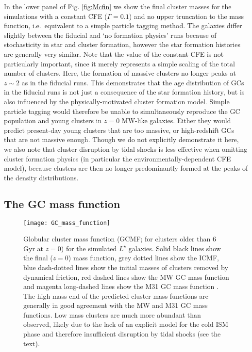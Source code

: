 \documentclass[fleqn,usenatbib]{mnras}
\begin{document}
In the lower panel of Fig. \ref{fig:Mcfin} we show the final cluster masses for the simulations with a constant CFE ($\Gamma = 0.1$) and no upper truncation to the mass function, i.e.~equivalent to a simple particle tagging method. The galaxies differ slightly between the fiducial and `no formation physics' runs because of stochasticity in star and cluster formation, however the star formation histories are generally very similar. Note that the value of the constant CFE is not particularly important, since it merely represents a simple scaling of the total number of clusters.
Here, the formation of massive clusters no longer peaks at $z\sim2$ as in the fiducial runs. This demonstrates that the age distribution of GCs in the fiducial runs is not just a consequence of the star formation history, but is also influenced by the physically-motivated cluster formation model. Simple particle tagging would therefore be unable to simultaneously reproduce the GC population and young clusters in $z=0$ MW-like galaxies. Either they would predict present-day young clusters that are too massive, or high-redshift GCs that are not massive enough. Though we do not explicitly demonstrate it here, we also note that cluster disruption by tidal shocks is less effective when omitting cluster formation physics (in particular the environmentally-dependent CFE model), because clusters are then no longer predominantly formed at the peaks of the density distributions.


\subsection{The GC mass function} \label{sec:GCMF}

\begin{figure*}
  \texttt{[image: GC\_mass\_function]}
  \caption{ Globular cluster mass function (GCMF; for clusters older than 6 Gyr at $z=0$) for the simulated $L^\star$ galaxies. Solid black lines show the final ($z=0$) mass function, grey dotted lines show the ICMF, blue dash-dotted lines show the initial masses of clusters removed by dynamical friction, red dashed lines show the MW GC mass function \citep{Harris_96} and magenta long-dashed lines show the M31 GC mass function \citep{Caldwell_et_al_11, Huxor_et_al_14}. The high mass end of the predicted cluster mass functions are generally in good agreement with the MW and M31 GC mass functions. Low mass clusters are much more abundant than observed, likely due to the lack of an explicit model for the cold ISM phase and therefore insufficient disruption by tidal shocks (see the text). }
  \label{fig:GCMF}
\end{figure*}
\end{document}
